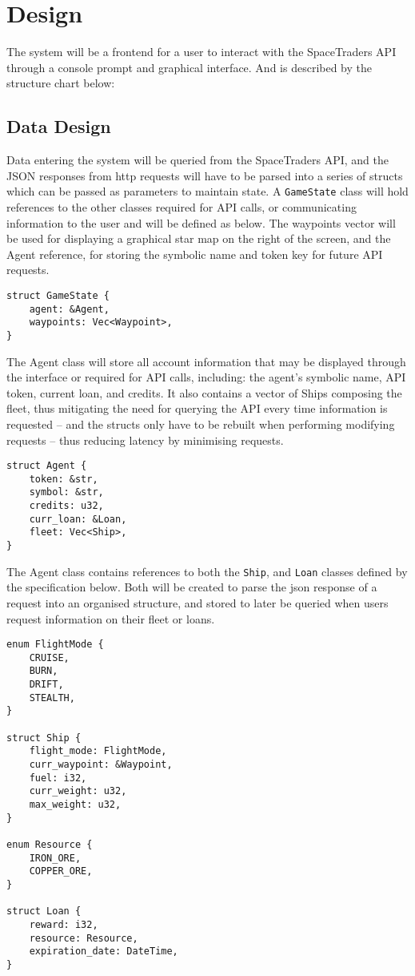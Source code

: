 \section{Design}
The system will be a frontend for a user to interact with the SpaceTraders API through a console prompt and graphical interface. And is described by the structure chart below:



\subsection{Data Design}
Data entering the system will be queried from the SpaceTraders API, and the JSON responses from http requests will have to be parsed into a series of structs which can be passed as parameters to maintain state. A \texttt{GameState} class will hold references to the other classes required for API calls, or communicating information to the user and will be defined as below. The waypoints vector will be used for displaying a graphical star map on the right of the screen, and the Agent reference, for storing the symbolic name and token key for future API requests.
\begin{lstlisting}
struct GameState {
    agent: &Agent,
    waypoints: Vec<Waypoint>,
}
\end{lstlisting}

The Agent class will store all account information that may be displayed through the interface or required for API calls, including: the agent's symbolic name, API token, current loan, and credits. It also contains a vector of Ships composing the fleet, thus mitigating the need for querying the API every time information is requested – and the structs only have to be rebuilt when performing modifying requests – thus reducing latency by minimising requests.
\begin{lstlisting}
struct Agent {
    token: &str, 
    symbol: &str,
    credits: u32,
    curr_loan: &Loan,
    fleet: Vec<Ship>,
} 
\end{lstlisting}

The Agent class contains references to both the \texttt{Ship}, and \texttt{Loan} classes defined by the specification below. Both will be created to parse the json response of a request into an organised structure, and stored to later be queried when users request information on their fleet or loans.
\begin{lstlisting}
enum FlightMode {
    CRUISE,
    BURN,
    DRIFT,
    STEALTH,
}

struct Ship {
    flight_mode: FlightMode,
    curr_waypoint: &Waypoint,
    fuel: i32,
    curr_weight: u32,
    max_weight: u32,
}

enum Resource {
    IRON_ORE,
    COPPER_ORE,
}

struct Loan { 
    reward: i32,
    resource: Resource,
    expiration_date: DateTime,
}
\end{lstlisting}

